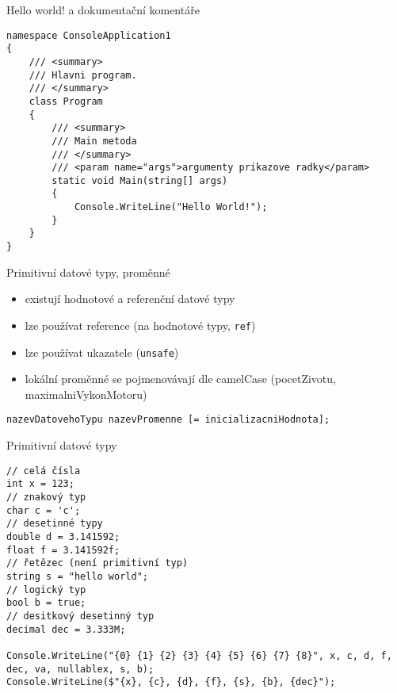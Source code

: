 \begin{frame}[fragile]
\begin{exampleblock}{Hello world! a dokumentační komentáře}
\begin{lstlisting}[basicstyle=\small]
namespace ConsoleApplication1
{
    /// <summary>
    /// Hlavni program.
    /// </summary>
    class Program
    {
        /// <summary>
        /// Main metoda
        /// </summary>
        /// <param name="args">argumenty prikazove radky</param>
        static void Main(string[] args)
        {
            Console.WriteLine("Hello World!");
        }
    }
}
\end{lstlisting}
\end{exampleblock}
\end{frame}





\begin{frame}[fragile]
\vfill
\begin{block}{Primitivní datové typy, proměnné}
\begin{itemize}
\item existují hodnotové a referenční datové typy
\item lze používat reference (na hodnotové typy, \lstinline|ref|)
\item lze používat ukazatele (\lstinline|unsafe|)
\item lokální proměnné se pojmenovávají dle camelCase (pocetZivotu, maximalniVykonMotoru)
\end{itemize}
\end{block}
\vfill
\begin{noteblock}{}
\begin{lstlisting}
nazevDatovehoTypu nazevPromenne [= inicializacniHodnota];
\end{lstlisting}
\end{noteblock}
\vfill
\end{frame}




\begin{frame}[fragile]
\begin{exampleblock}{Primitivní datové typy}
\begin{lstlisting}
// celá čísla
int x = 123;
// znakový typ
char c = 'c';
// desetinné typy
double d = 3.141592;
float f = 3.141592f;
// řetězec (není primitivní typ)
string s = "hello world";
// logický typ
bool b = true;
// desitkový desetinný typ
decimal dec = 3.333M;
           
Console.WriteLine("{0} {1} {2} {3} {4} {5} {6} {7} {8}", x, c, d, f, dec, va, nullablex, s, b);
Console.WriteLine($"{x}, {c}, {d}, {f}, {s}, {b}, {dec}");
\end{lstlisting}
\end{exampleblock}
\end{frame}

